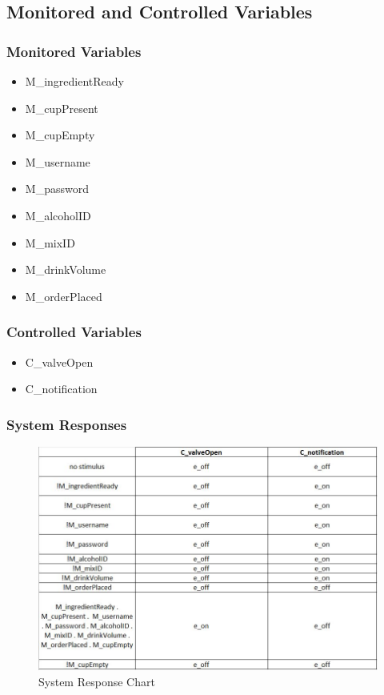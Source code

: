 \documentclass{article}
\begin{document}
\subsection{Monitored and Controlled Variables}
\subsubsection{Monitored Variables} %
    \begin{itemize}
        \item M\_ingredientReady
        \item M\_cupPresent
        \item M\_cupEmpty
        \item M\_username
        \item M\_password
        \item M\_alcoholID
        \item M\_mixID
        \item M\_drinkVolume
        \item M\_orderPlaced
    \end{itemize}
    
\subsubsection{Controlled Variables} %
    \begin{itemize}
        \item C\_valveOpen
        \item C\_notification
    \end{itemize}
\subsubsection{System Responses}
    
    \begin{figure}[H]
    \centerline{\includegraphics[scale=0.9]{SystemResponse.JPG}}
    \caption{System Response Chart}
    \label{fig}
    \end{figure}
\end{document}
